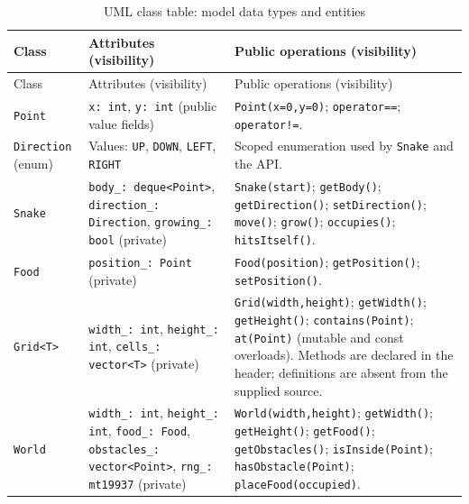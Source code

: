 \documentclass[12pt,a4paper]{report}
\begin{document}
\small
\begin{longtable}{p{28mm}p{54mm}p{73mm}}
\caption{UML class table: model data types and entities}\label{tab:uml-entities}\\
\toprule
Class & Attributes (visibility) & Public operations (visibility)\\
\midrule
\endfirsthead
\toprule Class & Attributes (visibility) & Public operations (visibility)\\
\midrule
\endhead
\bottomrule
\endfoot
\texttt{Point} & \texttt{x: int}, \texttt{y: int} (public value fields) &
\texttt{Point(x=0,y=0)}; \texttt{operator==}; \texttt{operator!=}.\\
\texttt{Direction} (enum) & Values: \texttt{UP}, \texttt{DOWN},
\texttt{LEFT}, \texttt{RIGHT} & Scoped enumeration used by \texttt{Snake}
and the API.\\
\texttt{Snake} & \texttt{body\_: deque<Point>}, \texttt{direction\_: Direction},
\texttt{growing\_: bool} (private) & \texttt{Snake(start)};
\texttt{getBody()}; \texttt{getDirection()}; \texttt{setDirection()};
\texttt{move()}; \texttt{grow()}; \texttt{occupies()}; \texttt{hitsItself()}.\\
\texttt{Food} & \texttt{position\_: Point} (private) & \texttt{Food(position)};
\texttt{getPosition()}; \texttt{setPosition()}.\\
\texttt{Grid<T>} & \texttt{width\_: int}, \texttt{height\_: int},
\texttt{cells\_: vector<T>} (private) & \texttt{Grid(width,height)};
\texttt{getWidth()}; \texttt{getHeight()}; \texttt{contains(Point)};
\texttt{at(Point)} (mutable and const overloads). Methods are declared in the
header; definitions are absent from the supplied source.\\
\texttt{World} & \texttt{width\_: int}, \texttt{height\_: int},
\texttt{food\_: Food}, \texttt{obstacles\_: vector<Point>},
\texttt{rng\_: mt19937} (private) & \texttt{World(width,height)};
\texttt{getWidth()}; \texttt{getHeight()}; \texttt{getFood()};
\texttt{getObstacles()}; \texttt{isInside(Point)}; \texttt{hasObstacle(Point)};
\texttt{placeFood(occupied)}.\\
\end{longtable}
\normalsize
\end{document}
